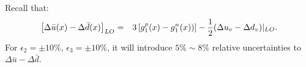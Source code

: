 Recall that:
\begin{eqnarray}
\left[\Delta \bar{u}(x) - \Delta \bar{d}(x) \right]_{LO} & = & 3 \left[ g_1^p(x)- g_1^n(x)) \right] 
 - {1 \over 2} (\Delta u_v - \Delta d_v) \vert_{LO}.
\end{eqnarray}
For $\epsilon_2= \pm 10 \%$, $\epsilon_3= \pm 10 \%$,  it will introduce $5\% \sim 8 \%$ relative uncertainties to $\Delta \bar{u} -\Delta \bar{d}$. 

